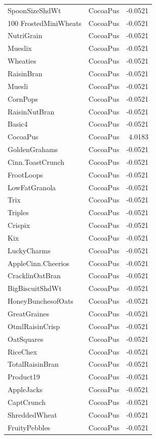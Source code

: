 \begin{longtable}{llr}
SpoonSizeShdWt & CocoaPus & -0.0521 \\
100%
FrostedMiniWheats & CocoaPus & -0.0521 \\
NutriGrain & CocoaPus & -0.0521 \\
Mueslix & CocoaPus & -0.0521 \\
Wheaties & CocoaPus & -0.0521 \\
RaisinBran & CocoaPus & -0.0521 \\
Muesli & CocoaPus & -0.0521 \\
CornPops & CocoaPus & -0.0521 \\
RaisinNutBran & CocoaPus & -0.0521 \\
Basic4 & CocoaPus & -0.0521 \\
CocoaPus & CocoaPus & 4.0183 \\
GoldenGrahams & CocoaPus & -0.0521 \\
Cinn.ToastCrunch & CocoaPus & -0.0521 \\
FrootLoops & CocoaPus & -0.0521 \\
LowFatGranola & CocoaPus & -0.0521 \\
Trix & CocoaPus & -0.0521 \\
Triples & CocoaPus & -0.0521 \\
Crispix & CocoaPus & -0.0521 \\
Kix & CocoaPus & -0.0521 \\
LuckyCharms & CocoaPus & -0.0521 \\
AppleCinn.Cheerios & CocoaPus & -0.0521 \\
CracklinOatBran & CocoaPus & -0.0521 \\
BigBiscuitShdWt & CocoaPus & -0.0521 \\
HoneyBunchesofOats & CocoaPus & -0.0521 \\
GreatGraines & CocoaPus & -0.0521 \\
OtmlRaisinCrisp & CocoaPus & -0.0521 \\
OatSquares & CocoaPus & -0.0521 \\
RiceChex & CocoaPus & -0.0521 \\
TotalRaisinBran & CocoaPus & -0.0521 \\
Product19 & CocoaPus & -0.0521 \\
AppleJacks & CocoaPus & -0.0521 \\
CaptCrunch & CocoaPus & -0.0521 \\
ShreddedWheat & CocoaPus & -0.0521 \\
FruityPebbles & CocoaPus & -0.0521 \\

\end{longtable}
